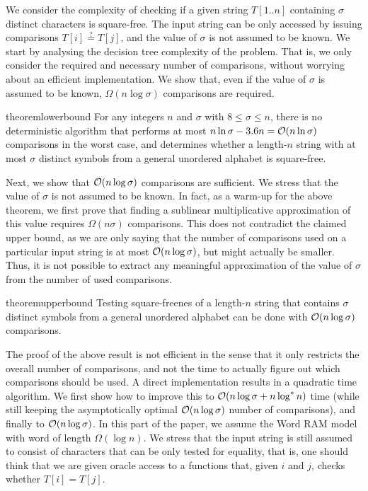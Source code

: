 We consider the complexity of checking if a given string $T[1..n]$ containing $\sigma$ distinct characters is square-free. 
The input string can be only accessed by issuing comparisons $T[i]\stackrel{?}{=} T[j]$, and the value of $\sigma$ is not
assumed to be known. We start by analysing the decision tree complexity of the problem. That is, we only
consider the required and necessary number of comparisons, without worrying about an efficient implementation.
We show that, even if the value of $\sigma$ is assumed to be known, $\Omega(n\log \sigma)$ comparisons are required. 

\begin{restatable}{theorem}{lowerbound}
\label{thm:lowerbound}
For any integers $n$ and $\sigma$ with $8 \leq \sigma \leq n$, there is no deterministic algorithm that performs at most $n \ln \sigma - 3.6n = \mathcal{O}(n \ln \sigma)$ comparisons in the worst case, and determines whether a length-$n$ string with at most $\sigma$ distinct symbols from a general unordered alphabet is square-free.
\end{restatable}

Next, we show that $\mathcal{O}(n\log \sigma)$ comparisons are sufficient. We stress that the value of $\sigma$ is not assumed to
be known. In fact, as a warm-up for the above theorem, we first prove that finding a sublinear multiplicative approximation
of this value requires $\Omega(n\sigma)$ comparisons. This does not contradict the claimed upper bound, as we are only saying
that the number of comparisons used on a particular input string is at most $\mathcal{O}(n\log \sigma)$, but might actually be smaller.
Thus, it is not possible to extract any meaningful approximation of the value of $\sigma$ from the number of used comparisons.

\begin{restatable}{theorem}{upperbound}
\label{thm:upperbound}
Testing square-freenes of a length-$n$ string that contains $\sigma$ distinct symbols from a general unordered alphabet can be done with $\mathcal{O}(n \log \sigma)$ comparisons.
\end{restatable}

The proof of the above result is not efficient in the sense that it only restricts the overall number of comparisons, and not the time
to actually figure out which comparisons should be used.  A direct implementation results in a quadratic time algorithm. We first
show how to improve this to $\mathcal{O}(n\log \sigma+n\log^{*}n)$ time (while still keeping the asymptotically optimal $\mathcal{O}(n\log \sigma)$ number
of comparisons), and finally to $\mathcal{O}(n\log \sigma)$. In this part of the paper, we assume the Word RAM model with word of length $\Omega(\log n)$.
We stress that the input string is still assumed to consist of characters that can be only tested for equality, that is, one should
think that we are given oracle access to a functions that, given $i$ and $j$, checks whether $T[i]=T[j]$.


